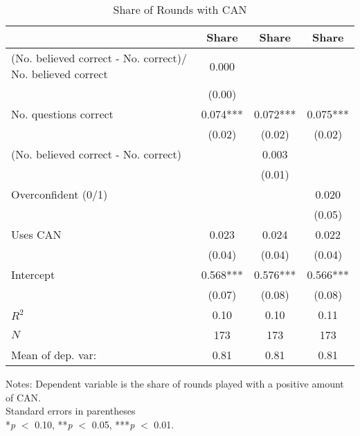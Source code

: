 \begin{table}[htbp]
\centering
\hspace*{-1.2cm}
\begin{threeparttable}
\caption{Share of Rounds with CAN}
\label{tab:D1can}
\begin{tabular}{l ccc}
\hline
\hline
                    &       Share   &       Share   &       Share   \\
\hline
(No. believed correct - No. correct)/ No. believed correct&       0.000   &               &               \\
                    &      (0.00)   &               &               \\
No. questions correct&       0.074***&       0.072***&       0.075***\\
                    &      (0.02)   &      (0.02)   &      (0.02)   \\
(No. believed correct - No. correct)&               &       0.003   &               \\
                    &               &      (0.01)   &               \\
Overconfident (0/1) &               &               &       0.020   \\
                    &               &               &      (0.05)   \\
Uses CAN            &       0.023   &       0.024   &       0.022   \\
                    &      (0.04)   &      (0.04)   &      (0.04)   \\
Intercept           &       0.568***&       0.576***&       0.566***\\
                    &      (0.07)   &      (0.08)   &      (0.08)   \\
\hline
$R^2$               &        0.10   &        0.10   &        0.11   \\
$N$                 &         173   &         173   &         173   \\
Mean of dep. var:   &        0.81   &        0.81   &        0.81   \\
\hline
\hline
\end{tabular}
\begin{tablenotes}
\footnotesize
\item{Notes: Dependent variable is the share of rounds played with a positive amount of CAN. \\ Standard errors in parentheses \\ *\textit{p} $<$ 0.10, **\textit{p} $<$ 0.05, ***\textit{p} $<$ 0.01.}
\end{tablenotes}
\end{threeparttable}
\end{table}
